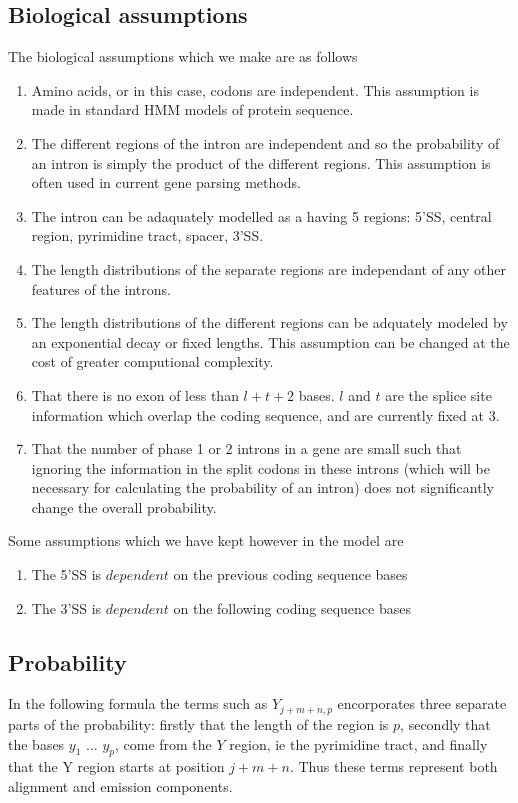 \subsection{Biological assumptions}
The biological assumptions which we make are as follows
\begin{enumerate}
\item Amino acids, or in this case, codons are independent. This assumption
is made in standard HMM models of protein sequence.
\item The different regions of the intron are independent and so the 
probability of an intron is simply the product of the different regions.
This assumption is often used in current gene parsing methods.
\item The intron can be adaquately modelled as a having 5 regions: 5'SS, central
region, pyrimidine tract, spacer, 3'SS.
\item The length distributions of the separate regions are independant of
any other features of the introns.
\item The length distributions of the different regions can be adquately
modeled by an exponential decay or fixed lengths. This assumption can be
changed at the cost of greater computional complexity.
\item That there is no exon of less than $l+t+2$ bases. $l$ and $t$ are 
the splice site information which overlap the coding sequence, and are 
currently fixed at 3.
\item That the number of phase 1 or 2 introns in a gene are small such
 that ignoring
the information in the split codons in these introns (which
will be necessary for calculating the probability of an intron) does not 
significantly change the overall probability.
\end{enumerate}
Some assumptions which we have kept however in the model are
\begin{enumerate}
\item The 5'SS is $dependent$ on the previous coding sequence bases
\item The 3'SS is $dependent$ on the following coding sequence bases
\end{enumerate}


\subsection{Probability}
In the following formula the terms such as $Y_{j+m+n,p}$ encorporates three
separate parts of the probability: firstly that the length of the region is
$p$, secondly that the bases $y_1$ ... $y_p$,
come from the $Y$ region, ie the pyrimidine tract, and finally
that the Y region starts at position $j+m+n$. Thus these terms represent
both alignment and emission components.

